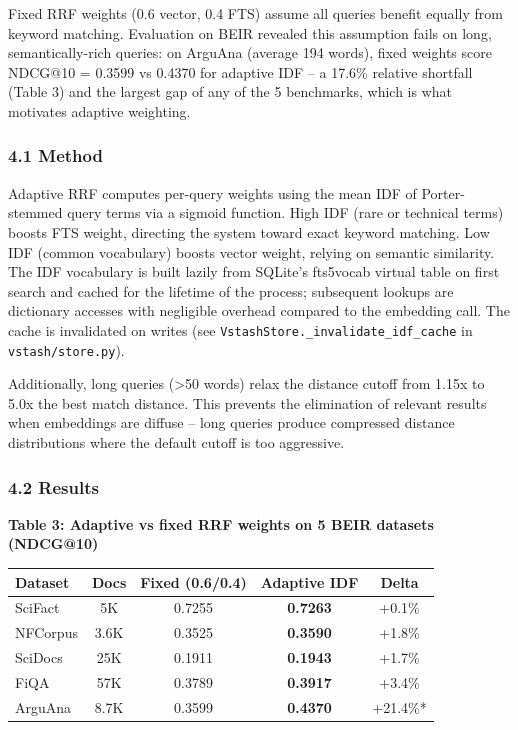 \documentclass[
  11pt]{article}
\newcounter{none} %
\begin{document}
Fixed RRF weights (0.6 vector, 0.4 FTS) assume all queries benefit equally from keyword matching. Evaluation on BEIR revealed this assumption fails on long, semantically-rich queries: on ArguAna (average 194 words), fixed weights score NDCG@10 = 0.3599 vs 0.4370 for adaptive IDF -- a 17.6\% relative shortfall (Table 3) and the largest gap of any of the 5 benchmarks, which is what motivates adaptive weighting.

\subsubsection{4.1 Method}\label{method}

Adaptive RRF computes per-query weights using the mean IDF of Porter-stemmed query terms via a sigmoid function. High IDF (rare or technical terms) boosts FTS weight, directing the system toward exact keyword matching. Low IDF (common vocabulary) boosts vector weight, relying on semantic similarity. The IDF vocabulary is built lazily from SQLite's fts5vocab virtual table on first search and cached for the lifetime of the process; subsequent lookups are dictionary accesses with negligible overhead compared to the embedding call. The cache is invalidated on writes (see \texttt{VstashStore.\_invalidate\_idf\_cache} in \texttt{vstash/store.py}).

Additionally, long queries (\textgreater50 words) relax the distance cutoff from 1.15x to 5.0x the best match distance. This prevents the elimination of relevant results when embeddings are diffuse -- long queries produce compressed distance distributions where the default cutoff is too aggressive.

\subsubsection{4.2 Results}\label{results}

\textbf{Table 3: Adaptive vs fixed RRF weights on 5 BEIR datasets (NDCG@10)}

{\def\LTcaptype{none} %
\begin{longtable}[]{@{}lcccc@{}}
\toprule\noalign{}
Dataset & Docs & Fixed (0.6/0.4) & Adaptive IDF & Delta \\
\midrule\noalign{}
\endhead
\bottomrule\noalign{}
\endlastfoot
SciFact & 5K & 0.7255 & \textbf{0.7263} & +0.1\% \\
NFCorpus & 3.6K & 0.3525 & \textbf{0.3590} & +1.8\% \\
SciDocs & 25K & 0.1911 & \textbf{0.1943} & +1.7\% \\
FiQA & 57K & 0.3789 & \textbf{0.3917} & +3.4\% \\
ArguAna & 8.7K & 0.3599 & \textbf{0.4370} & +21.4\%* \\
\end{longtable}
}
\end{document}
